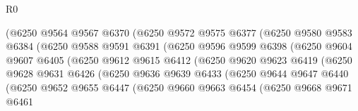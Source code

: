 \begin{lexlean}{R0}
\begin{coremodule}
                          (@6250
                            @9564
                            @9567
                            @6370
                            (@6250
                              @9572
                              @9575
                              @6377
                              (@6250
                                @9580
                                @9583
                                @6384
                                (@6250
                                  @9588
                                  @9591
                                  @6391
                                  (@6250
                                    @9596
                                    @9599
                                    @6398
                                    (@6250
                                      @9604
                                      @9607
                                      @6405
                                      (@6250
                                        @9612
                                        @9615
                                        @6412
                                        (@6250
                                          @9620
                                          @9623
                                          @6419
                                          (@6250
                                            @9628
                                            @9631
                                            @6426
                                            (@6250
                                              @9636
                                              @9639
                                              @6433
                                              (@6250
                                                @9644
                                                @9647
                                                @6440
                                                (@6250
                                                  @9652
                                                  @9655
                                                  @6447
                                                  (@6250
                                                    @9660
                                                    @9663
                                                    @6454
                                                    (@6250
                                                      @9668
                                                      @9671
                                                      @6461

\end{coremodule}
\end{lexlean}
